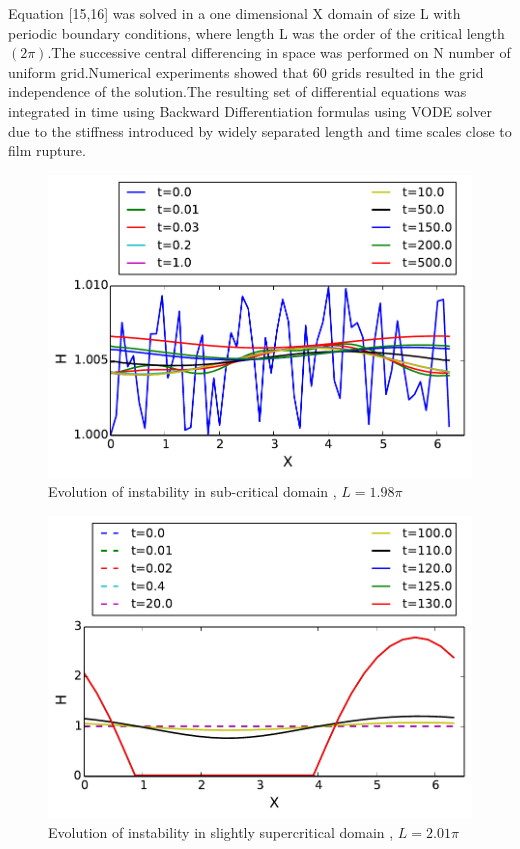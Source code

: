 \documentclass[
manuscript=article]{achemso}
\begin{document}
Equation [15,16] was solved in a one dimensional X domain  of size L with periodic boundary conditions, where length L was the order of the critical length $ (2 \pi) $.The successive central differencing in space was performed on  N number of uniform grid.Numerical experiments showed that 60 grids resulted in the grid independence of the solution.The resulting set of differential equations was integrated in time using Backward Differentiation formulas using VODE solver~\cite{13} due to the stiffness introduced by widely separated length and time scales close to film rupture.

\begin{center}
\begin{figure}[h!]
 \includegraphics[]{1_98pi.pdf}
 \caption{Evolution of instability in sub-critical domain , $ L = 1.98\pi $ } \label{fig:impinge}
\end{figure}
\end{center}

\begin{center}
\begin{figure}[h!]
 \includegraphics[]{2pi.pdf}
 \caption{Evolution of instability in slightly supercritical domain , $ L = 2.01\pi $ } \label{fig:impinge}
\end{figure}
\end{center}
\end{document}
